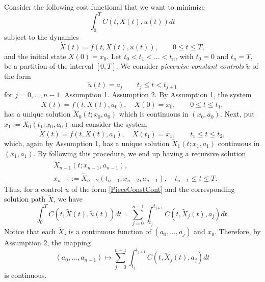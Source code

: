 Consider the following cost functional that we want to minimize
\begin{equation}\label{costFunctional}
  \int_0^T C(t,X(t),u(t)) dt
\end{equation}
subject to the dynamics
\begin{equation}\label{dynamics}
  \dot{X}(t) = f(t,X(t),u(t)),  \qquad    0\leq t \leq T,
\end{equation}
and the initial state $X(0)=x_0$. Let $t_0<t_1<\ldots <t_n$, with
$t_0=0$ and $t_n=T$, be a partition of the interval $[0,T]$.
We consider {\it piecewise constant controls} $\tilde{u}$ of the form
\begin{equation}\label{PieceConstCont}
  \tilde{u}(t) = a_j\qquad t_j\leq t < t_{j+1}
\end{equation}
 for $j=0,\ldots,n-1$.
{\sc Assumption 1}.
{\sc Assumption 2}.
By Assumption 1, the system
\[
  \dot{X}(t) = f(t,X(t),a_0), \quad X(0)=x_0, \qquad    0\leq t \leq t_1,
\]
has a unique solution $\tilde{X}_0(t;x_0,a_0)$ which is continuous in
$(x_0,a_0)$.  Next, put $x_1:=\tilde{X}_0(t_1;x_0,a_0)$ and consider the system
\[
  \dot{X}(t) = f(t,X(t),a_1), \quad X(t_1)=x_1, \qquad    t_1\leq t \leq t_2,
\]
which, again by Assumption 1, has a unique solution $\tilde{X}_1(t;x_1,a_1)$
continuous in $(x_1,a_1)$. By following this procedure, we end up having a
recursive solution
\begin{equation*}
  \begin{aligned}
    & \tilde{X}_{n-1}(t;x_{n-1},a_{n-1}),\\
    & x_{n-1}:=\tilde{X}_{n-2}(t_{n-1};x_{n-2},a_{n-1}),
    \quad t_{n-1}\leq t \leq T.
  \end{aligned}
\end{equation*}
Thus, for a control $\tilde{u}$ of the form \eqref{PieceConstCont} and the
corresponding solution path $\tilde{X}$, we have
\[
  \int_0^T
    C(t,\tilde{X}(t),
    \tilde{u}(t)) dt =
      \sum_{j=0}^{n-1}
        \int_{t_j}^{t_{j+1}}
        C(t,\tilde{X}_j(t),a_j) dt.
\]
Notice that each $\tilde{X}_j$ is a continuous function of $(a_0,\ldots,a_j)$
and $x_0$. Therefore, by Assumption 2, the mapping
\[
  (a_0,\ldots,a_{n-1})
  \mapsto
  \sum_{j=0}^{n-1}
  \int_{t_j}^{t_{j+1}} C(t,\tilde{X}_j(t),a_j) dt
\]
is continuous.
